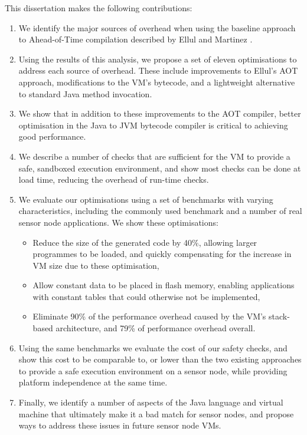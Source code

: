 \noindent
This dissertation makes the following contributions:
\begin{enumerate}
    \item We identify the major sources of overhead when using the baseline approach to Ahead-of-Time compilation described by Ellul and Martinez \cite{Ellul:2010iw, Ellul:2012thesis}.
    \item Using the results of this analysis, we propose a set of eleven optimisations to address each source of overhead. These include improvements to Ellul's AOT approach, modifications to the VM's bytecode, and a lightweight alternative to standard Java method invocation.    
    \item We show that in addition to these improvements to the AOT compiler, better optimisation in the Java to JVM bytecode compiler is critical to achieving good performance.
    \item We describe a number of checks that are sufficient for the VM to provide a safe, sandboxed execution environment, and show most checks can be done at load time, reducing the overhead of run-time checks.
    \item We evaluate our optimisations using a set of benchmarks with varying characteristics, including the commonly used  benchmark \cite{coremark} and a number of real sensor node applications. We show these optimisations:
    \begin{itemize}
    	\item Reduce the size of the generated code by 40\%, allowing larger programmes to be loaded, and quickly compensating for the increase in VM size due to these optimisation, 
    	\item Allow constant data to be placed in flash memory, enabling applications with constant tables that could otherwise not be implemented,
    	\item Eliminate 90\% of the performance overhead caused by the VM's stack-based architecture, and 79\% of performance overhead overall.
    \end{itemize}
    \item Using the same benchmarks we evaluate the cost of our safety checks, and show this cost to be comparable to, or lower than the two existing approaches to provide a safe execution environment on a sensor node, while providing platform independence at the same time.
    \item Finally, we identify a number of aspects of the Java language and virtual machine that ultimately make it a bad match for sensor nodes, and propose ways to address these issues in future sensor node VMs.
\end{enumerate}

